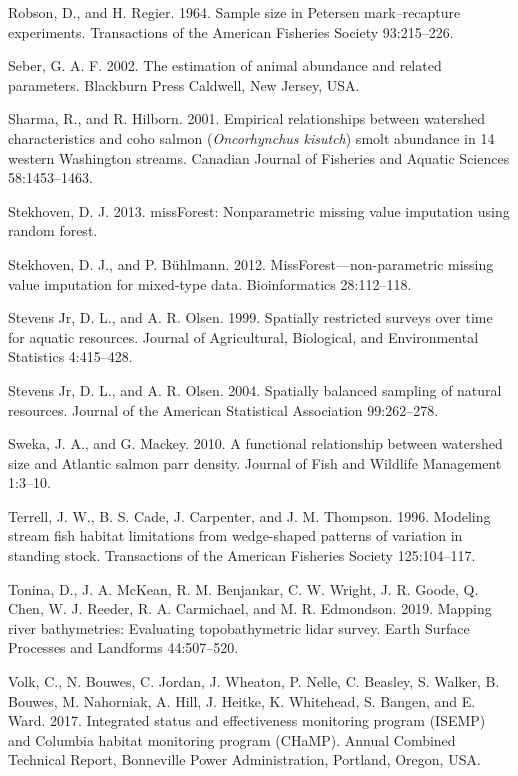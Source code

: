 \documentclass[
  12pt,
]{article}
\begin{document}
\leavevmode\hypertarget{ref-Robson1964}{}%
Robson, D., and H. Regier. 1964. Sample size in Petersen mark--recapture experiments. Transactions of the American Fisheries Society 93:215--226.

\leavevmode\hypertarget{ref-Seber2002}{}%
Seber, G. A. F. 2002. The estimation of animal abundance and related parameters. Blackburn Press Caldwell, New Jersey, USA.

\leavevmode\hypertarget{ref-Sharma2001}{}%
Sharma, R., and R. Hilborn. 2001. Empirical relationships between watershed characteristics and coho salmon (\emph{Oncorhynchus kisutch}) smolt abundance in 14 western Washington streams. Canadian Journal of Fisheries and Aquatic Sciences 58:1453--1463.

\leavevmode\hypertarget{ref-R-missForest}{}%
Stekhoven, D. J. 2013. missForest: Nonparametric missing value imputation using random forest.

\leavevmode\hypertarget{ref-Stekhoven2012}{}%
Stekhoven, D. J., and P. Bühlmann. 2012. MissForest---non-parametric missing value imputation for mixed-type data. Bioinformatics 28:112--118.

\leavevmode\hypertarget{ref-Stevens1999}{}%
Stevens Jr, D. L., and A. R. Olsen. 1999. Spatially restricted surveys over time for aquatic resources. Journal of Agricultural, Biological, and Environmental Statistics 4:415--428.

\leavevmode\hypertarget{ref-Stevens2004}{}%
Stevens Jr, D. L., and A. R. Olsen. 2004. Spatially balanced sampling of natural resources. Journal of the American Statistical Association 99:262--278.

\leavevmode\hypertarget{ref-Sweka2010}{}%
Sweka, J. A., and G. Mackey. 2010. A functional relationship between watershed size and Atlantic salmon parr density. Journal of Fish and Wildlife Management 1:3--10.

\leavevmode\hypertarget{ref-Terrell1996}{}%
Terrell, J. W., B. S. Cade, J. Carpenter, and J. M. Thompson. 1996. Modeling stream fish habitat limitations from wedge-shaped patterns of variation in standing stock. Transactions of the American Fisheries Society 125:104--117.

\leavevmode\hypertarget{ref-Tonina2019}{}%
Tonina, D., J. A. McKean, R. M. Benjankar, C. W. Wright, J. R. Goode, Q. Chen, W. J. Reeder, R. A. Carmichael, and M. R. Edmondson. 2019. Mapping river bathymetries: Evaluating topobathymetric lidar survey. Earth Surface Processes and Landforms 44:507--520.

\leavevmode\hypertarget{ref-Volk2017}{}%
Volk, C., N. Bouwes, C. Jordan, J. Wheaton, P. Nelle, C. Beasley, S. Walker, B. Bouwes, M. Nahorniak, A. Hill, J. Heitke, K. Whitehead, S. Bangen, and E. Ward. 2017. Integrated status and effectiveness monitoring program (ISEMP) and Columbia habitat monitoring program (CHaMP). Annual Combined Technical Report, Bonneville Power Administration, Portland, Oregon, USA.
\end{document}
